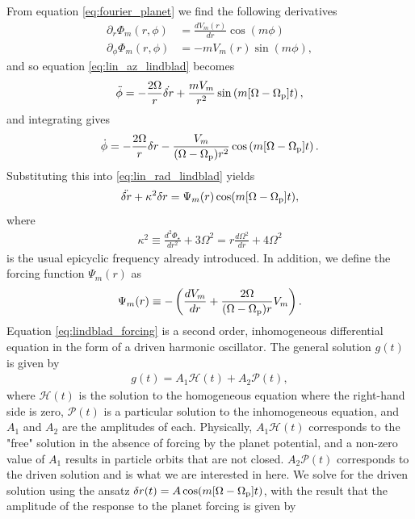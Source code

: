 From equation \ref{eq:fourier_planet} we find the following derivatives
\begin{align}
    \partial_r \Phi_m (r, \phi) &= \frac{dV_m(r)}{dr} \cos (m \phi) \\
    \partial_\phi \Phi_m (r, \phi) &= - m V_m(r) \sin (m \phi),
\end{align}
and so equation \ref{eq:lin_az_lindblad} becomes
\begin{align}
    \ddot{\phi} = - \frac{2 \Omega}{r} \dot{\delta r} + \frac{m V_m}{r^2} \sin \left( m [ \Omega - \Omega_{\rm p}] t\right),
\end{align}
and integrating gives
\begin{align}
    \dot{\phi} = - \frac{2 \Omega}{r} \delta r - \frac{V_m}{(\Omega - \Omega_{\rm p}) r^2} \cos \left( m [ \Omega - \Omega_{\rm p}] t \right).
\end{align}
Substituting this into \ref{eq:lin_rad_lindblad} yields
\begin{align}
    \ddot{\delta r} + \kappa^2 \delta r = \Psi_m(r) \cos (m [ \Omega - \Omega_{\rm p}] t), \label{eq:lindblad_forcing}
\end{align}
where
\begin{align}
    \kappa^2 \equiv \frac{d^2 \Phi_\star}{dr^2} + 3 \Omega^2 = r \frac{d \Omega^2}{dr} + 4 \Omega^2
\end{align}
is the usual epicyclic frequency already introduced. In addition, we define the forcing function $\Psi_m(r)$ as
\begin{align}
    \Psi_m(r) \equiv - \left( \frac{dV_m}{dr}+ \frac{2 \Omega}{(\Omega - \Omega_{\rm p})r} V_m \right).
\end{align}
Equation \ref{eq:lindblad_forcing} is a second order, inhomogeneous differential equation in the form of a driven harmonic oscillator.
The general solution $g(t)$ is given by 
\begin{align}
    g(t) = A_1 \mathcal{H}(t) + A_2 \mathcal{P}(t),
\end{align}
where $\mathcal{H}(t)$ is the solution to the homogeneous equation where the right-hand side is zero, $\mathcal{P}(t)$ is a particular solution to the inhomogeneous equation, and $A_1$ and $A_2$ are the amplitudes of each.
Physically, $A_1 \mathcal{H}(t)$ corresponds to the "free" solution in the absence of forcing by the planet potential, and a non-zero value of $A_1$ results in particle orbits that are not closed.
$A_2 \mathcal{P}(t)$ corresponds to the driven solution and is what we are interested in here.
We solve for the driven solution using the ansatz $\delta r (t) = A \cos (m [\Omega - \Omega_{\rm p}]t)$, with the result that the amplitude of the response to the planet forcing is given by 
